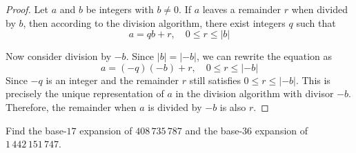 \begin{solutions*}
  \fixlistskip
  \begin{proof}
    Let $a$ and $b$ be integers with $b \neq 0$. If $a$ leaves a remainder 
$r$ when divided by $b$, then according to the division algorithm, there exist integers $q$ such that 
\[a = qb + r, \quad 0 \leq r \leq |b|\]

Now consider division by $-b$. Since $|b| = |-b|$, we can rewrite the equation as
\[a = (-q)(-b)+r, \quad 0 \leq r \leq |-b|\]
Since $-q$ is an integer and the remainder $r$ still satisfies $0 \leq r \leq |-b|$. This is precisely the unique representation of $a$ in the division algorithm with divisor $-b$. Therefore, the remainder when $a$ is divided by $-b$ is also $r$.
  \end{proof}
\end{solutions*}


\begin{exercise}
Find the base-$17$ expansion of $408\,735\,787$ and the base-$36$ expansion of $1\,442\,151\,747$.
\end{exercise}

